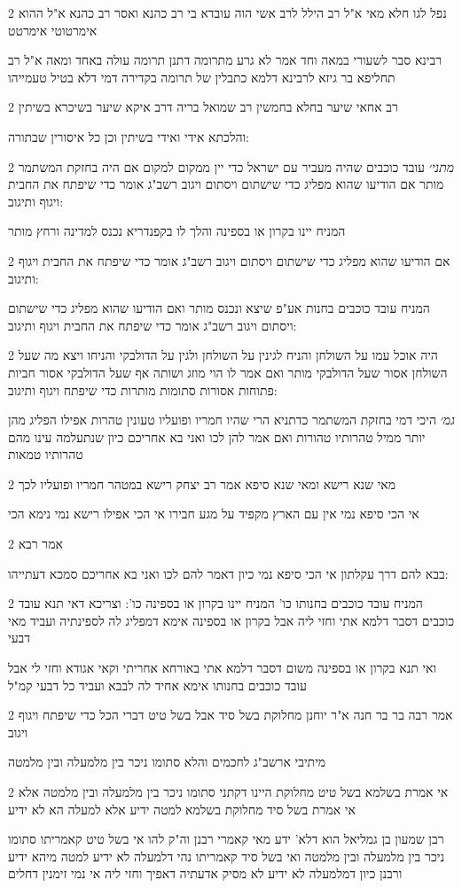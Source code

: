 \documentclass[12pt, openany]{book}
\newcommand{\sethebfont}{
\fontsize{10.5pt}{21.0pt} \selectfont
}
\newcommand{\twocol}[1]{
	{\sethebfont \begin{multicols}{2}
			#1
	\end{multicols}}	
}
\begin{document}
\twocol{נפל לגו חלא מאי א"ל רב הילל לרב אשי הוה עובדא בי רב כהנא ואסר רב כהנא א"ל ההוא אימרטוטי אימרטט
\par רבינא סבר לשעורי במאה וחד אמר לא גרע מתרומה דתנן תרומה עולה באחד ומאה א"ל רב תחליפא בר גיזא לרבינא דלמא כתבלין של תרומה בקדירה דמי דלא בטיל טעמייהו}
\twocol{רב אחאי שיער בחלא בחמשין רב שמואל בריה דרב איקא שיער בשיכרא בשיתין
\par והלכתא אידי ואידי בשיתין וכן כל איסורין שבתורה:}
\twocol{{\large\emph{מתני׳}} עובד כוכבים שהיה מעביר עם ישראל כדי יין ממקום למקום אם היה בחזקת המשתמר מותר אם הודיעו שהוא מפליג כדי שישתום ויסתום ויגוב רשב"ג אומר כדי שיפתח את החבית ויגוף ותיגוב:
\par המניח יינו בקרון או בספינה והלך לו בקפנדריא נכנס למדינה ורחץ מותר}
\twocol{אם הודיעו שהוא מפליג כדי שישתום ויסתום ויגוב רשב"ג אומר כדי שיפתח את החבית ויגוף ותיגוב:
\par המניח עובד כוכבים בחנות אע"פ שיצא ונכנס מותר ואם הודיעו שהוא מפליג כדי שישתום ויסתום ויגוב רשב"ג אומר כדי שיפתח את החבית ויגוף ותיגוב:}
\twocol{היה אוכל עמו על השולחן והניח לגינין על השולחן ולגין על הדולבקי והניחו ויצא מה שעל השולחן אסור שעל הדולבקי מותר ואם אמר לו הוי מוזג ושותה אף שעל הדולבקי אסור חביות פתוחות אסורות סתומות מותרות כדי שיפתח ויגוף ותיגוב:
\par {\large\emph{גמ׳}} היכי דמי בחזקת המשתמר כדתניא הרי שהיו חמריו ופועליו טעונין טהרות אפילו הפליג מהן יותר ממיל טהרותיו טהורות ואם אמר להן לכו ואני בא אחריכם כיון שנתעלמה עינו מהם טהרותיו טמאות}
\twocol{מאי שנא רישא ומאי שנא סיפא אמר רב יצחק רישא במטהר חמריו ופועליו לכך
\par אי הכי סיפא נמי אין עם הארץ מקפיד על מגע חבירו אי הכי אפילו רישא נמי נימא הכי}
\twocol{אמר רבא
\par בבא להם דרך עקלתון אי הכי סיפא נמי כיון דאמר להם לכו ואני בא אחריכם סמכא דעתייהו:}
\twocol{המניח עובד כוכבים בחנותו כו' המניח יינו בקרון או בספינה כו': וצריכא דאי תנא עובד כוכבים דסבר דלמא אתי וחזי ליה אבל בקרון או בספינה אימא דמפליג לה לספינתיה ועביד מאי דבעי
\par ואי תנא בקרון או בספינה משום דסבר דלמא אתי באורחא אחריתי וקאי אגודא וחזי לי אבל עובד כוכבים בחנותו אימא אחיד לה לבבא ועביד כל דבעי קמ"ל}
\twocol{אמר רבה בר בר חנה א"ר יוחנן מחלוקת בשל סיד אבל בשל טיט דברי הכל כדי שיפתח ויגוף ויגוב
\par מיתיבי ארשב"ג לחכמים והלא סתומו ניכר בין מלמעלה ובין מלמטה}
\twocol{אי אמרת בשלמא בשל טיט מחלוקת היינו דקתני סתומו ניכר בין מלמעלה ובין מלמטה אלא אי אמרת בשל סיד מחלוקת בשלמא למטה ידיע אלא למעלה הא לא ידיע
\par רבן שמעון בן גמליאל הוא דלא' ידע מאי קאמרי רבנן וה"ק להו אי בשל טיט קאמריתו סתומו ניכר בין מלמעלה ובין מלמטה ואי בשל סיד קאמריתו נהי דלמעלה לא ידיע למטה מיהא ידיע ורבנן כיון דמלמעלה לא ידיע לא מסיק אדעתיה דאפיך וחזי ליה אי נמי זימנין דחלים}
\end{document}
